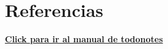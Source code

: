 \documentclass[10pt, a4paper, twocolumn]{article}
\begin{document}
\section*{Referencias}
\printbibliography[heading=none]


\href{http://tug.ctan.org/macros/latex/contrib/todonotes/todonotes.pdf}
{\textbf{Click para ir al manual de todonotes}}
\end{document}
